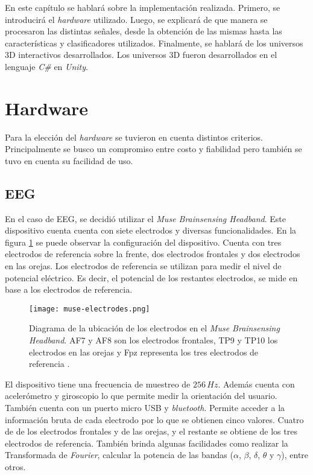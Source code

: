 En este capítulo se hablará sobre la implementación realizada. Primero, se introducirá el \emph{hardware} utilizado. Luego, se explicará de que manera se procesaron las distintas señales, desde la obtención de las mismas hasta las características y clasificadores utilizados. Finalmente, se hablará de los universos 3D interactivos desarrollados. Los universos 3D fueron desarrollados en el lenguaje \emph{C\#} en \emph{Unity}.

\section{Hardware}

Para la elección del \emph{hardware} se tuvieron en cuenta distintos criterios. Principalmente se busco un compromiso entre costo y fiabilidad pero también se tuvo en cuenta su facilidad de uso.

\subsection{EEG}

En el caso de EEG, se decidió utilizar el \emph{Muse Brainsensing Headband}. Este dispositivo cuenta cuenta con siete electrodos y diversas funcionalidades. En la figura \ref{fig:muse-electrodes} se puede observar la configuración del dispositivo. Cuenta con tres electrodos de referencia sobre la frente, dos electrodos frontales y dos electrodos en las orejas. Los electrodos de referencia se utilizan para medir el nivel de potencial eléctrico. Es decir, el potencial de los restantes electrodos, se mide en base a los electrodos de referencia.

\begin{figure}[H]
	\centering
    \texttt{[image: muse-electrodes.png]}
    \caption{Diagrama de la ubicación de los electrodos en el \emph{Muse Brainsensing Headband}. AF7 y AF8 son los electrodos frontales, TP9 y TP10 los electrodos en las orejas y Fpz representa los tres electrodos de referencia \cite{muse-hardware}.}
	\label{fig:muse-electrodes}
\end{figure}

El dispositivo tiene una frecuencia de muestreo de $ 256 \, Hz$. Además cuenta con acelerómetro y giroscopio lo que permite medir la orientación del usuario. También cuenta con un puerto micro USB y \emph{bluetooth}. Permite acceder a la información bruta de cada electrodo por lo que se obtienen cinco valores. Cuatro de de los electrodos frontales y de las orejas, y el restante se obtiene de los tres electrodos de referencia. También brinda algunas facilidades como realizar la Transformada de \emph{Fourier},  calcular la potencia de las bandas ($\alpha$, $\beta$, $\delta$, $\theta$ y $\gamma$), entre otros.


